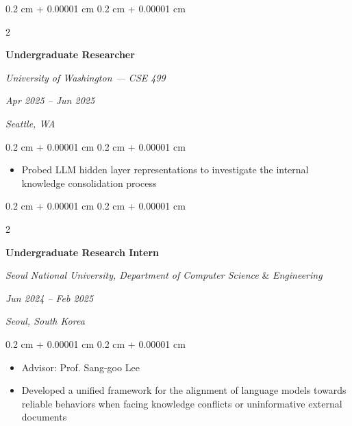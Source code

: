 \documentclass[10pt, letterpaper]{article}
\newenvironment{highlights}{
    \begin{itemize}[
        topsep=0.10 cm,
        parsep=0.10 cm,
        partopsep=0pt,
        itemsep=0pt,
        leftmargin=0.4 cm + 10pt
    ]
}{
    \end{itemize}
} %
\newenvironment{onecolentry}{
    \begin{adjustwidth}{
        0.2 cm + 0.00001 cm
    }{
        0.2 cm + 0.00001 cm
    }
}{
    \end{adjustwidth}
} %
\newenvironment{twocolentry}[2][]{
    \onecolentry
    \def\secondColumn{#2}
    \setcolumnwidth{\fill, 4.5 cm}
    \begin{paracol}{2}
}{
    \switchcolumn \raggedleft \secondColumn
    \end{paracol}
    \endonecolentry
} %
\begin{document}
        \begin{twocolentry}{
        \textit{Apr 2025 – Jun 2025}
        
        \textit{Seattle, WA}}
            \textbf{Undergraduate Researcher}

            \textit{University of Washington --- CSE 499}
        \end{twocolentry}

        \vspace{0.10 cm}
        \begin{onecolentry}
            \begin{highlights}
                \item Probed LLM hidden layer representations to investigate the internal knowledge consolidation process
            \end{highlights}
        \end{onecolentry}

        \vspace{0.4 cm}

            \begin{twocolentry}{
            \textit{Jun 2024 – Feb 2025}
            
            \textit{Seoul, South Korea}}
                \textbf{Undergraduate Research Intern}

                \textit{Seoul National University,  Department of Computer Science} \& \textit{Engineering}
            \end{twocolentry}

            \vspace{0.10 cm}
            \begin{onecolentry}
                \begin{highlights}
                    \item Advisor: Prof. Sang-goo Lee
                    \item Developed a unified framework for the alignment of language models towards reliable behaviors when facing knowledge conflicts or uninformative external documents
                \end{highlights}
            \end{onecolentry}

        \vspace{0.4 cm}

\end{document}
